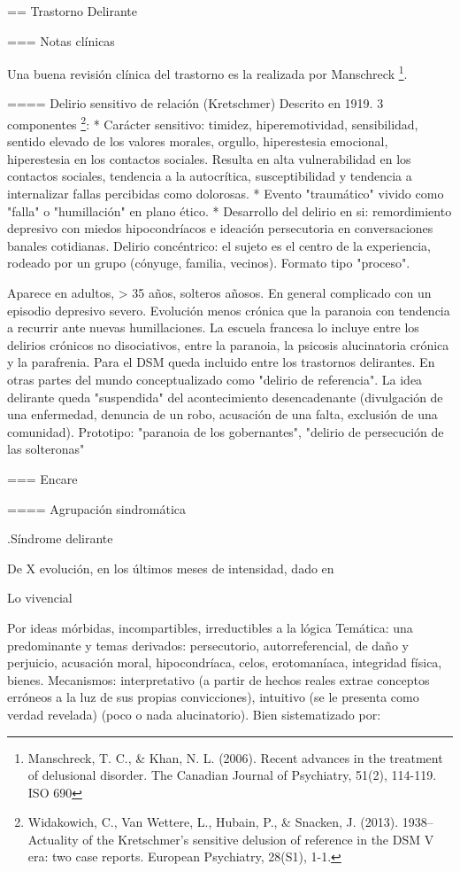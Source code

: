== Trastorno Delirante

=== Notas clínicas

Una buena revisión clínica del trastorno es la realizada por Manschreck \footnote{Manschreck, T. C., \& Khan, N. L. (2006). Recent advances in the treatment of delusional disorder. The Canadian Journal of Psychiatry, 51(2), 114-119. ISO 690}.

==== Delirio sensitivo de relación (Kretschmer)
Descrito en 1919. 3 componentes \footnote{Widakowich, C., Van Wettere, L., Hubain, P., \& Snacken, J. (2013). 1938–Actuality of the Kretschmer's sensitive delusion of reference in the DSM V era: two case reports. European Psychiatry, 28(S1), 1-1.}:
* Carácter sensitivo: timidez, hiperemotividad, sensibilidad, sentido elevado de los valores morales, orgullo, hiperestesia emocional, hiperestesia en los contactos sociales. Resulta en alta vulnerabilidad en los contactos sociales, tendencia a la autocrítica, susceptibilidad y tendencia a internalizar fallas percibidas como dolorosas.
* Evento "traumático" vivido como "falla" o "humillación" en plano ético.
* Desarrollo del delirio en si: remordimiento depresivo con miedos hipocondríacos e ideación persecutoria en conversaciones banales cotidianas. Delirio concéntrico: el sujeto es el centro de la experiencia, rodeado por un grupo (cónyuge, familia, vecinos). Formato tipo "proceso".

Aparece en adultos, > 35 años, solteros añosos. En general complicado con un episodio depresivo severo. Evolución menos crónica que la paranoia con tendencia a recurrir ante nuevas humillaciones.
La escuela francesa lo incluye entre los delirios crónicos no disociativos, entre la paranoia, la psicosis alucinatoria crónica y la parafrenia.
Para el DSM queda incluido entre los trastornos delirantes. En otras partes del mundo conceptualizado como "delirio de referencia". La idea delirante queda "suspendida" del acontecimiento desencadenante (divulgación de una enfermedad, denuncia de un robo, acusación de una falta, exclusión de una comunidad). Prototipo: "paranoia de los gobernantes", "delirio de persecución de las solteronas"
 
=== Encare

==== Agrupación sindromática

.Síndrome delirante

De X evolución, en los últimos meses de intensidad, dado en

Lo vivencial

Por ideas mórbidas, incompartibles, irreductibles a la lógica Temática: una predominante y temas derivados: persecutorio, autorreferencial, de daño y perjuicio, acusación moral, hipocondríaca, celos, erotomaníaca, integridad física, bienes. Mecanismos: interpretativo (a partir de hechos reales extrae conceptos erróneos a la luz de sus propias convicciones), intuitivo (se le presenta como verdad revelada) (poco o nada alucinatorio). Bien sistematizado por:

